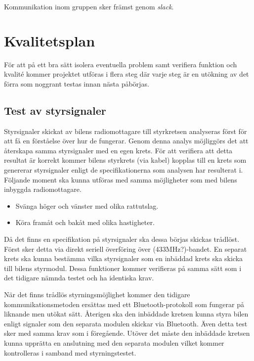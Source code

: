 \documentclass[a4paper]{article}
\begin{document}
\vspace{5mm}
\noindent Kommunikation inom gruppen sker främst genom {\it slack}.


\section{Kvalitetsplan}
För att på ett bra sätt isolera eventuella problem samt verifiera funktion och kvalité kommer projektet utföras i flera steg där varje steg är en utökning av det förra som noggrant testas innan nästa påbörjas. 


\subsection{Test av styrsignaler}
Styrsignaler skickat av bilens radiomottagare till styrkretsen analyseras först för att få en förståelse över hur de fungerar. Genom denna analys möjliggörs det att återskapa samma styrsignaler med en egen krets. För att verifiera att detta resultat är korrekt kommer bilens styrkrets (via kabel) kopplas till en krets som genererar styrsignaler enligt de specifikationerna som analysen har resulterat i. Följande moment ska kunna utföras med samma möjligheter som med bilens inbyggda radiomottagare.
\begin{itemize}  
    \item Svänga höger och vänster med olika rattutslag.
    \item Köra framåt och bakåt med olika hastigheter.
\end{itemize}
Då det finns en specifikation på styrsignaler ska dessa börjas skickas trådlöst. Först sker detta via direkt seriell överföring över (433MHz?)-bandet. En separat krets ska kunna bestämma vilka styrsignaler som en inbäddad krets ska skicka till bilens styrmodul. Dessa funktioner kommer verifieras på samma sätt som i det tidigare nämnda testet och ha identiska krav.  


När det finns trådlös styrningsmöjlighet kommer den tidigare kommunikationsmetoden ersättas med ett Bluetooth-protokoll som fungerar på liknande men utökat sätt. Återigen ska den inbäddade kretsen kunna styra bilen enligt signaler som den separata modulen skickar via Bluetooth. Även detta test sker med samma krav som i föregående. Utöver det måste den inbäddade kretsen kunna upprätta en anslutning med den separata modulen vilket kommer kontrolleras i samband med styrningstestet.


\end{document}
